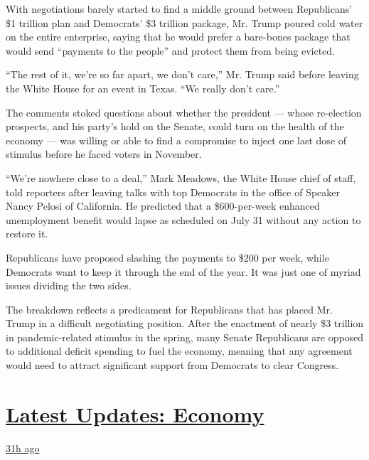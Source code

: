 With negotiations barely started to find a middle ground between
Republicans' \$1 trillion plan and Democrats' \$3 trillion package, Mr.
Trump poured cold water on the entire enterprise, saying that he would
prefer a bare-bones package that would send ``payments to the people''
and protect them from being evicted.

``The rest of it, we're so far apart, we don't care,'' Mr. Trump said
before leaving the White House for an event in Texas. ``We really don't
care.''

The comments stoked questions about whether the president --- whose
re-election prospects, and his party's hold on the Senate, could turn on
the health of the economy --- was willing or able to find a compromise
to inject one last dose of stimulus before he faced voters in November.

``We're nowhere close to a deal,'' Mark Meadows, the White House chief
of staff, told reporters after leaving talks with top Democrats in the
office of Speaker Nancy Pelosi of California. He predicted that a
\$600-per-week enhanced unemployment benefit would lapse as scheduled on
July 31 without any action to restore it.

Republicans have proposed slashing the payments to \$200 per week, while
Democrats want to keep it through the end of the year. It was just one
of myriad issues dividing the two sides.

The breakdown reflects a predicament for Republicans that has placed Mr.
Trump in a difficult negotiating position. After the enactment of nearly
\$3 trillion in pandemic-related stimulus in the spring, many Senate
Republicans are opposed to additional deficit spending to fuel the
economy, meaning that any agreement would need to attract significant
support from Democrats to clear Congress.

\hypertarget{latest-updates-economy}{%
\section{\texorpdfstring{\href{https://www.nytimes3xbfgragh.onion/live/2020/07/31/business/stock-market-today-coronavirus?action=click\&pgtype=Article\&state=default\&region=MAIN_CONTENT_1\&context=storylines_live_updates}{Latest
Updates:
Economy}}{Latest Updates: Economy}}\label{latest-updates-economy}}

\href{https://www.nytimes3xbfgragh.onion/live/2020/07/31/business/stock-market-today-coronavirus?action=click\&pgtype=Article\&state=default\&region=MAIN_CONTENT_1\&context=storylines_live_updates\#kodaks-chief-executive-was-given-stock-options-then-the-share-price-spiked-1000-percent}{31h
ago}

